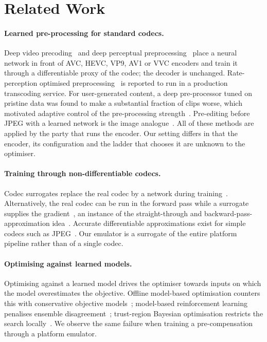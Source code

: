 \section{Related Work}
\label{sec:related}

\paragraph{Learned pre-processing for standard codecs.}
Deep video precoding~\cite{bourtsoulatze2020deep} and deep perceptual
preprocessing~\cite{chadha2021deep} place a neural network in front of AVC, HEVC, VP9, AV1 or VVC
encoders and train it through a differentiable proxy of the codec; the decoder is unchanged.
Rate-perception optimised preprocessing~\cite{ma2023rate} is reported to run in a production
transcoding service. For user-generated content, a deep pre-processor tuned on pristine data was
found to make a substantial fraction of clips worse, which motivated adaptive control of the
pre-processing strength~\cite{zhao2025tridynamic}. Pre-editing before JPEG with a learned network
is the image analogue~\cite{talebi2021better}. All of these methods are applied by the party that
runs the encoder. Our setting differs in that the encoder, its configuration and the ladder that
chooses it are unknown to the optimiser. 

\paragraph{Training through non-differentiable codecs.}
Codec surrogates replace the real codec by a network during
training~\cite{tian2021self,chadha2021deep}. Alternatively, the real codec can be run in the
forward pass while a surrogate supplies the gradient~\cite{pesnel2026scaled}, an instance of the
straight-through and backward-pass-approximation
idea~\cite{bengio2013estimating,athalye2018obfuscated}. Accurate differentiable approximations exist
for simple codecs such as JPEG~\cite{reich2024differentiable}. Our emulator is a surrogate of the
entire platform pipeline rather than of a single codec.

\paragraph{Optimising against learned models.}
Optimising against a learned model drives the optimiser towards inputs on which the model
overestimates the objective. Offline model-based optimisation counters this with conservative
objective models~\cite{trabucco2021conservative}; model-based reinforcement learning penalises
ensemble disagreement~\cite{yu2020mopo}; trust-region Bayesian optimisation restricts the search
locally~\cite{eriksson2019scalable}. We observe the same failure when training a pre-compensation
through a platform emulator.


